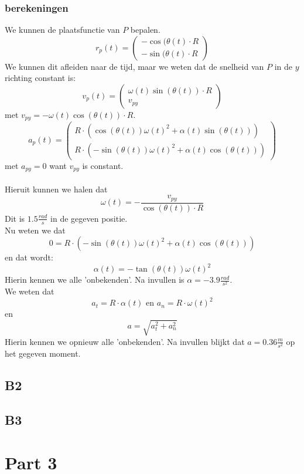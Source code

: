 \documentclass[10pt,a4paper]{article}
\begin{document}
\subsubsection*{berekeningen}
We kunnen de plaatsfunctie van $P$ bepalen.
\[
r_{p}(t)=
\begin{pmatrix}
-\cos{(\theta(t)}\cdot R\\
-\sin{(\theta(t)}\cdot R
\end{pmatrix}
\] 
We kunnen dit afleiden naar de tijd, maar we weten dat de snelheid van $P$ in de $y$ richting constant is:
\[
v_{p}(t)=
\begin{pmatrix}
\omega(t)\sin{(\theta(t))}\cdot R\\
v_{py}
\end{pmatrix}
\]
met $v_{py} = -\omega(t)\cos{(\theta(t))}\cdot R$.
\[
a_{p}(t)=
\begin{pmatrix}
R\cdot(\cos{(\theta(t))}\omega(t)^{2} + \alpha(t)\sin{(\theta(t))})\\
R\cdot(-\sin{(\theta(t))}\omega(t)^{2} + \alpha(t)\cos{(\theta(t))})
\end{pmatrix}
\]
met $a_{py} = 0$ want $v_{py}$ is constant.
\\\\
Hieruit kunnen we halen dat 
\[
\omega(t) = -\frac{v_{py}}{\cos{(\theta(t))}\cdot R}
\]
Dit is $1.5 \frac{rad}{s}$ in de gegeven positie.\\
Nu weten we dat
\[
0=R\cdot(-\sin{(\theta(t))}\omega(t)^{2} + \alpha(t)\cos{(\theta(t))})
\]
en dat wordt:
\[
\alpha(t) = -\tan{(\theta(t))}\omega(t)^{2}
\]
Hierin kennen we alle 'onbekenden'. Na invullen is $\alpha = -3.9\frac{rad}{s^{2}}$.\\
We weten dat
\[
a_{t} = R\cdot\alpha(t) \text{ en } a_{n} = R\cdot \omega(t)^{2}
\]
en
\[
a = \sqrt{a_{t}^{2} + a_{n}^{2}}
\]
Hierin kennen we opnieuw alle 'onbekenden'. Na invullen blijkt dat $a=0.36\frac{m}{s^{2}}$ op het gegeven moment.

\subsection{B2}

\subsection{B3}

\section{Part 3}
\end{document}
